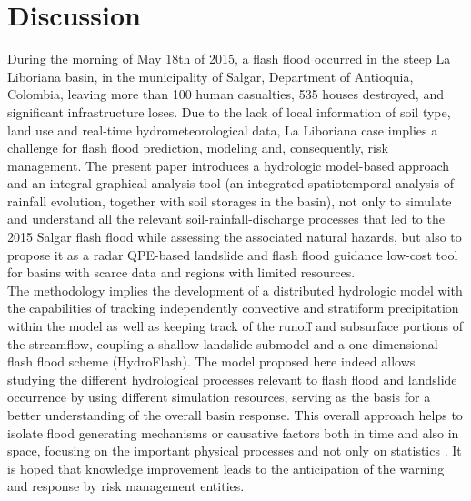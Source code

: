 \documentclass[hess, manuscript]{copernicus}
\begin{document}

\section{Discussion}
\label{sec:discussion}

During the morning of May 18th of 2015,  a flash flood occurred in the steep La Liboriana basin, in the municipality of Salgar,  Department of Antioquia, Colombia, leaving more than 100 human casualties, 535 houses destroyed, and significant infrastructure loses.  Due to the lack of local information of soil type, land use and real-time hydrometeorological data, La Liboriana case implies a challenge for flash flood prediction, modeling and, consequently, risk management.  The present paper introduces a hydrologic model-based approach and an integral graphical analysis tool (an integrated spatiotemporal analysis of rainfall evolution, together with soil storages in the basin),  not only to simulate and understand all the relevant soil-rainfall-discharge processes that  led to the 2015 Salgar flash flood while assessing the associated natural hazards, but also to propose it as a radar QPE-based landslide and flash flood guidance low-cost tool for basins with scarce data and regions with limited resources. \\

The methodology implies the development of a distributed hydrologic model with the capabilities of tracking independently convective and stratiform precipitation within the model as well as keeping track of the runoff and subsurface portions of the streamflow,  coupling a shallow landslide submodel and a one-dimensional flash flood scheme (HydroFlash).  The model proposed here indeed allows studying the different hydrological processes relevant to flash flood and landslide occurrence by using different simulation resources, serving as the basis for a better understanding of the overall basin response. This overall approach helps to isolate flood generating mechanisms or causative factors both in time and also in space, focusing on the important physical processes and not only on statistics \citep{klemes1993, Merz2003}. It is hoped that knowledge improvement leads to the anticipation of the warning and response by risk management entities. \\
\end{document}
